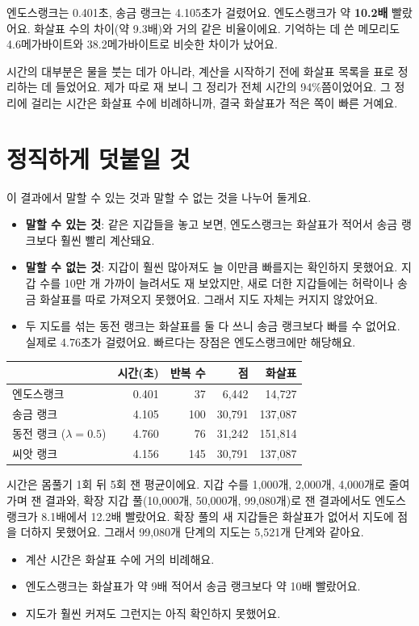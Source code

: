 엔도스랭크는 0.401초, 송금 랭크는 4.105초가 걸렸어요.
엔도스랭크가 약 \textbf{10.2배} 빨랐어요.
화살표 수의 차이(약 9.3배)와 거의 같은 비율이에요.
기억하는 데 쓴 메모리도 4.6메가바이트와 38.2메가바이트로 비슷한 차이가 났어요.

시간의 대부분은 물을 붓는 데가 아니라, 계산을 시작하기 전에 화살표 목록을 표로 정리하는 데 들었어요.
제가 따로 재 보니 그 정리가 전체 시간의 94\%쯤이었어요.
그 정리에 걸리는 시간은 화살표 수에 비례하니까, 결국 화살표가 적은 쪽이 빠른 거예요.

\section{정직하게 덧붙일 것}

이 결과에서 말할 수 있는 것과 말할 수 없는 것을 나누어 둘게요.

\begin{itemize}
\item \textbf{말할 수 있는 것}: 같은 지갑들을 놓고 보면, 엔도스랭크는 화살표가 적어서 송금 랭크보다 훨씬 빨리 계산돼요.
\item \textbf{말할 수 없는 것}: 지갑이 훨씬 많아져도 늘 이만큼 빠를지는 확인하지 못했어요.
      지갑 수를 10만 개 가까이 늘려서도 재 보았지만, 새로 더한 지갑들에는 허락이나 송금 화살표를 따로 가져오지 못했어요.
      그래서 지도 자체는 커지지 않았어요.
\item 두 지도를 섞는 동전 랭크는 화살표를 둘 다 쓰니 송금 랭크보다 빠를 수 없어요. 실제로 4.76초가 걸렸어요.
      빠르다는 장점은 엔도스랭크에만 해당해요.
\end{itemize}

\begin{deeper}[진짜 숫자]
\begin{center}
\small
\begin{tabular}{@{}lrrrr@{}}
\toprule
& 시간(초) & 반복 수 & 점 & 화살표 \\
\midrule
엔도스랭크 & 0.401 & 37 & 6,442 & 14,727 \\
송금 랭크 & 4.105 & 100 & 30,791 & 137,087 \\
동전 랭크 ($\lambda=0.5$) & 4.760 & 76 & 31,242 & 151,814 \\
씨앗 랭크 & 4.156 & 145 & 30,791 & 137,087 \\
\bottomrule
\end{tabular}
\end{center}
시간은 몸풀기 1회 뒤 5회 잰 평균이에요. 지갑 수를 1,000개, 2,000개, 4,000개로 줄여 가며 잰 결과와,
확장 지갑 풀(10,000개, 50,000개, 99,080개)로 잰 결과에서도 엔도스랭크가 8.1배에서 12.2배 빨랐어요.
확장 풀의 새 지갑들은 화살표가 없어서 지도에 점을 더하지 못했어요. 그래서 99,080개 단계의 지도는 5,521개 단계와 같아요.
\end{deeper}

\begin{learned}
\begin{itemize}
\item 계산 시간은 화살표 수에 거의 비례해요.
\item 엔도스랭크는 화살표가 약 9배 적어서 송금 랭크보다 약 10배 빨랐어요.
\item 지도가 훨씬 커져도 그런지는 아직 확인하지 못했어요.
\end{itemize}
\end{learned}
